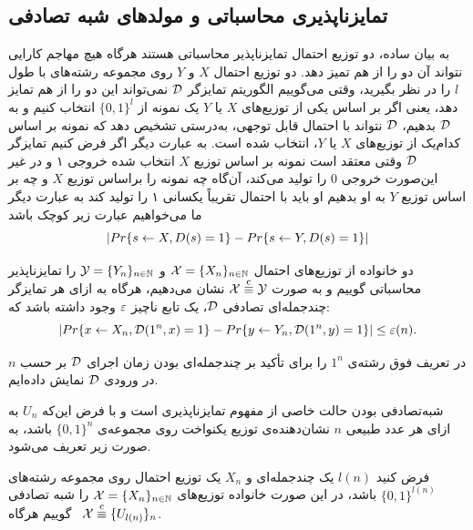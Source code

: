 \subsection*{تمایزناپذیری محاسباتی و مولدهای شبه تصادفی}
به بیان ساده، دو توزیع احتمال تمایزناپذیر محاسباتی هستند هرگاه هیچ مهاجم کارایی نتواند آن دو را از هم تمیز دهد. دو توزیع احتمال 
$X$
و
$Y$
روی مجموعه رشته‌های با طول 
$l$
را در نظر بگیرید، وقتی می‌گوییم الگوریتم تمایز‌گر 
$\mathcal{D}$
نمی‌تواند این دو را از هم تمایز دهد، یعنی اگر بر اساس یکی از توزیع‌های 
$X$
یا 
$Y$
یک نمونه از 
$\{0, 1\}^{l}$
انتخاب کنیم و به 
$\mathcal{D}$
 بدهیم، 
 $\mathcal{D}$
  نتواند با احتمال قابل توجهی، به‌درستی  تشخیص دهد که نمونه بر اساس کدام‌یک از توزیع‌های 
  $X$
  یا 
  $Y$،  
انتخاب شده است. 
   به عبارت دیگر اگر فرض کنیم تمایز‌گر
   $\mathcal{D}$
 وقتی معتقد است نمونه بر اساس توزیع 
 $X$
 انتخاب شده خروجی ۱ و در غیر این‌صورت خروجی 
 $0$
  را تولید می‌کند، آن‌گاه چه نمونه را براساس توزیع
 $X$
  و چه بر اساس توزیع 
  $Y$
  به او بدهیم او باید با احتمال تقریباً یکسانی ۱ را تولید کند به عبارت دیگر ما می‌خواهیم عبارت زیر کوچک باشد
  $$|Pr\{s\leftarrow X, D(s) = 1\} - Pr\{s\leftarrow Y, D(s) = 1\}|$$
  
\begin{definition}
دو خانواده از توزیع‌های احتمال 
${\mathcal X} = \{X_{n}\}_{n\in\mathbb{N}}$
و
${\mathcal Y} = \{Y_{n}\}_{n\in\mathbb{N}}$
را تمایزناپذیر محاسباتی گوییم و به صورت 
${\mathcal X} \stackrel{\text{c}}{\equiv} {\mathcal Y}$
نشان می‌دهیم،  هرگاه به ازای هر تمایز‌گر چندجمله‌ای تصادفی
$\mathcal{D}$، 
 یک تابع ناچیز 
 $\varepsilon$
 وجود داشته باشد که:
 $$|Pr\{x\leftarrow X_{n}, \mathcal{D}(1^{n}, x) = 1\} - Pr\{y\leftarrow Y_{n}, \mathcal{D}(1^{n}, y) = 1\}|\leq \varepsilon(n).$$
 
\end{definition}
در تعریف فوق رشته‌ی 
$1^{n}$
را برای تأکید بر چندجمله‌ای بودن زمان اجرای 
$\mathcal{D}$ 
بر حسب 
$n$
در ورودی 
$\mathcal{D}$
 نمایش داده‌ایم.

شبه‌تصادفی بودن  حالت خاصی از مفهوم تمایزناپذیری است و با فرض  این‌که
$U_{n}$
 به ازای هر عدد طبیعی 
 $n$
  نشان‌دهنده‌ی توزیع یکنواخت روی مجموعه‌ی 
  $\{0, 1\}^{n}$
  باشد، به صورت زیر تعریف می‌شود.
\begin{definition}
فرض کنید 
$l(n)$
یک چند‌جمله‌ای و 
$X_{n}$
یک توزیع احتمال  روی مجموعه رشته‌های 
 $\{0, 1\}^{l(n)}$
باشد، در این صورت خانواده توزیع‌های 
 ${\mathcal X} = \{X_{n}\}_{n\in\mathbb{N}}$
 را شبه تصادفی گوییم هر‌گاه \ 
${\mathcal X} \stackrel{\text{c}}{\equiv} \{U_{l(n)}\}_{n}$.
\end{definition}
 
